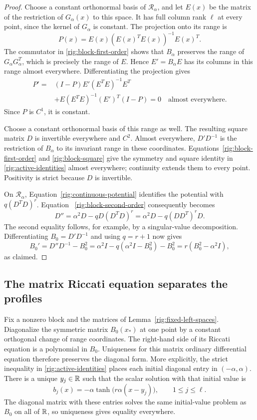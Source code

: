 \begin{proof}
Choose a constant orthonormal basis of $\mathcal R_\alpha$, and let
$E(x)$ be the matrix of the restriction of $G_\alpha(x)$ to this space.
It has full column rank $\ell$ at every point, since the kernel of
$G_\alpha$ is constant.  The projection onto its range is
\[
 P(x)=E(x)(E(x)^TE(x))^{-1}E(x)^T.
\]
The commutator in \eqref{rig:block-first-order} shows that $B_\alpha$
preserves the range of $G_\alpha G_\alpha^T$, which is precisely the
range of $E$.  Hence $E'=B_\alpha E$ has its columns in this range
almost everywhere.  Differentiating the projection gives
\begin{align*}
 P'={}&(I-P)E'(E^TE)^{-1}E^T\\
     &+E(E^TE)^{-1}(E')^T(I-P)=0
 \quad\text{almost everywhere}.
\end{align*}
Since $P$ is $C^1$, it is constant.

Choose a constant orthonormal basis of this range as well.  The resulting
square matrix $D$ is invertible everywhere and $C^2$.  Almost everywhere,
$D'D^{-1}$ is the restriction of $B_\alpha$ to its invariant range in
these coordinates.  Equations~\eqref{rig:block-first-order} and
\eqref{rig:block-square} give the symmetry and square identity in
\eqref{rig:active-identities} almost everywhere; continuity extends
them to every point.  Positivity is strict because $D$ is invertible.

On $\mathcal R_\alpha$, Equation~\eqref{rig:continuous-potential}
identifies the potential with $q(D^TD)^r$.  Equation~
\eqref{rig:block-second-order} consequently becomes
\[
 D''=\alpha^2D-qD(D^TD)^r
     =\alpha^2D-q(DD^T)^rD.
\]
The second equality follows, for example, by a singular-value
decomposition.  Differentiating $B_0=D'D^{-1}$ and using $q=r+1$
now gives
\[
 B_0'=D''D^{-1}-B_0^2
      =\alpha^2I-q(\alpha^2I-B_0^2)-B_0^2
      =r(B_0^2-\alpha^2I),
\]
as claimed.
\end{proof}

\subsection{The matrix Riccati equation separates the profiles}

Fix a nonzero block and the matrices of Lemma~\ref{rig:fixed-left-spaces}.
Diagonalize the symmetric matrix $B_0(x_*)$ at one point by a constant
orthogonal change of range coordinates.  The right-hand side of its
Riccati equation is a polynomial in $B_0$.  Uniqueness for this matrix
ordinary differential equation therefore preserves the diagonal form.
More explicitly, the strict inequality in \eqref{rig:active-identities}
places each initial diagonal entry in $(-\alpha,\alpha)$.  There is a
unique $y_j\in\mathbb R$ such that the scalar solution with that initial value is
\begin{equation}\label{rig:tanh}
 b_j(x)=-\alpha\tanh\bigl(r\alpha(x-y_j)\bigr),
 \qquad 1\le j\le\ell.
\end{equation}
The diagonal matrix with these entries solves the same initial-value
problem as $B_0$ on all of $\mathbb R$, so uniqueness gives equality everywhere.


